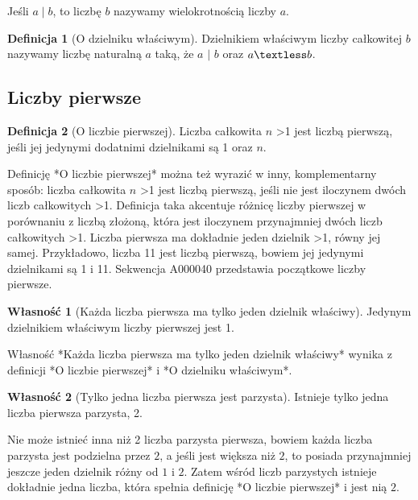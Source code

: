 \documentclass[10pt,onecolumn]{article}
\theoremstyle{definition}
\newtheorem{definition}{Definicja}
\theoremstyle{hypothesis}
\theoremstyle{capability}
\newtheorem{capability}{Własność}
\begin{document}
Jeśli $a \mid b$, to liczbę $b$ nazywamy wielokrotnością liczby $a$.

\begin{definition}[O dzielniku właściwym]
Dzielnikiem właściwym liczby całkowitej $b$ nazywamy liczbę naturalną $a$ taką, że $a$ $\mid$ $b$ oraz $a \textless b$.
\end{definition}

\subsection{Liczby pierwsze}

\begin{definition}[O liczbie pierwszej]
Liczba całkowita $n$ \textgreater 1 jest liczbą pierwszą, jeśli jej jedynymi dodatnimi dzielnikami są 1 oraz $n$. 
\end{definition}

Definicję *O liczbie pierwszej* można też wyrazić w inny, komplementarny sposób: liczba całkowita $n$ \textgreater 1 jest liczbą pierwszą, jeśli nie jest iloczynem dwóch liczb całkowitych \textgreater 1. Definicja taka akcentuje różnicę liczby pierwszej w porównaniu z liczbą złożoną, która jest iloczynem przynajmniej dwóch liczb całkowitych \textgreater 1. Liczba pierwsza ma dokładnie jeden dzielnik \textgreater 1, równy jej samej. Przykładowo, liczba 11 jest liczbą pierwszą, bowiem jej jedynymi dzielnikami są 1 i 11. Sekwencja A000040 przedstawia początkowe liczby pierwsze.

\begin{capability}[Każda liczba pierwsza ma tylko jeden dzielnik właściwy]
Jedynym dzielnikiem właściwym liczby pierwszej jest 1.
\end{capability}

Własność *Każda liczba pierwsza ma tylko jeden dzielnik właściwy* wynika z definicji *O liczbie pierwszej* i *O dzielniku właściwym*.

\begin{capability}[Tylko jedna liczba pierwsza jest parzysta]
Istnieje tylko jedna liczba pierwsza parzysta, 2.
\end{capability}

Nie może istnieć inna niż 2 liczba parzysta pierwsza, bowiem każda liczba parzysta jest podzielna przez $2$, a jeśli jest większa niż $2$, to posiada przynajmniej jeszcze jeden dzielnik różny od $1$ i $2$. Zatem wśród liczb parzystych istnieje dokładnie jedna liczba, która spełnia definicję *O liczbie pierwszej* i jest nią $2$.
\end{document}

